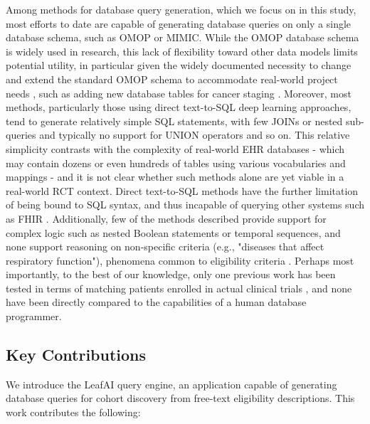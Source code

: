\documentclass[../main.tex]{subfiles}
\begin{document}
Among methods for database query generation, which we focus on in this study, most efforts to date are capable of generating database queries on only a single database schema, such as OMOP or MIMIC. While the OMOP database schema is widely used in research, this lack of flexibility toward other data models limits potential utility, in particular given the widely documented necessity to change and extend the standard OMOP schema to accommodate real-world project needs \cite{belenkaya2021extending, peng2021towards, zoch2021adaption, warner2019hemonc, zhou2013evaluation, shin2019genomic, kwon2019development}, such as adding new database tables for cancer staging \cite{belenkaya2021extending}. Moreover, most methods, particularly those using direct text-to-SQL deep learning approaches, tend to generate relatively simple SQL statements, with few JOINs or nested sub-queries and typically no support for UNION operators and so on. This relative simplicity contrasts with the complexity of real-world EHR databases - which may contain dozens or even hundreds of tables using various vocabularies and mappings - and it is not clear whether such methods alone are yet viable in a real-world RCT context. Direct text-to-SQL methods have the further limitation of being bound to SQL syntax, and thus incapable of querying other systems such as FHIR \cite{bender2013hl7}. Additionally, few of the methods described provide support for complex logic such as nested Boolean statements or temporal sequences, and none support reasoning on non-specific criteria (e.g., "diseases that affect respiratory function"), phenomena common to eligibility criteria \cite{wang2017classifying, ross2010analysis}. Perhaps most importantly, to the best of our knowledge, only one previous work has been tested in terms of matching patients enrolled in actual clinical trials \cite{zhang2020deepenroll}, and none have been directly compared to the capabilities of a human database programmer.

\subsection*{Key Contributions}

We introduce the LeafAI query engine, an application capable of generating database queries for cohort discovery from free-text eligibility descriptions. This work contributes the following:
\end{document}
